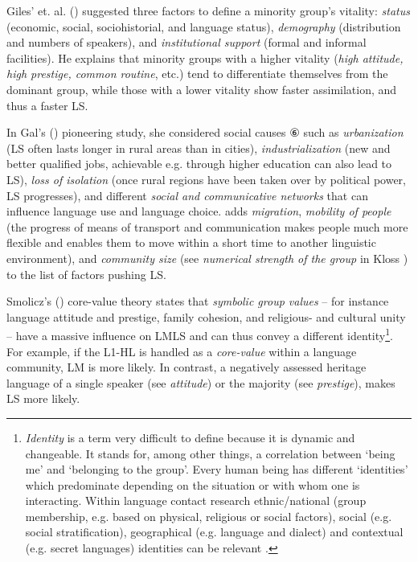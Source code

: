 \documentclass[output=paper,
modfonts
]{langscibook}
\begin{document}
Giles' et. al. (\citeyear{Giles1977}) suggested three factors to define a minority group's vitality: \emph{status} (economic, social, sociohistorial, and language status), \emph{demography} (distribution and numbers of speakers), and \emph{institutional support} (formal and informal facilities). He explains that minority groups with a higher vitality (\emph{high attitude, high prestige, common routine}, etc.) tend to differentiate themselves from the dominant group, while those with a lower vitality show faster assimilation, and thus a faster LS.

In Gal's (\citeyear{Gal1979}) pioneering study, she considered social causes ⑥ such as \emph{urbanization} (LS often lasts longer in rural areas than in cities), \emph{industrialization} (new and better qualified jobs, achievable e.g. through higher education can also lead to LS), \emph{loss of isolation} (once rural regions have been taken over by political power, LS progresses), and different \emph{social and communicative networks} that can influence language use and language choice. \cite{Dorian1980} adds \emph{migration}, \emph{mobility of people} (the progress of means of transport and communication makes people much more flexible and enables them to move within a short time to another linguistic environment), and \emph{community size} (see \emph{numerical strength of the group} in Kloss \citeyear{Kloss1966}) to the list of factors pushing LS.

Smolicz's (\citeyear{Smolicz1980}) core-value theory states that \emph{symbolic group values} -- for instance language attitude and prestige, family cohesion, and religious- and cultural unity -- have a massive influence on LMLS and can thus convey a different identity\footnote{\emph{Identity} is a term very difficult to define because it is dynamic and changeable. It stands for, among other things, a correlation between ‘being me' and ‘belonging to the group'. Every human being has different ‘identities' which predominate depending on the situation or with whom one is interacting. Within language contact research ethnic/national (group membership, e.g. based on physical, religious or social factors), social (e.g. social stratification), geographical (e.g. language and dialect) and contextual (e.g. secret languages) identities can be relevant \parencite[172-173]{Riehl2014}.}. For example, if the L1-HL is handled as a \emph{core-value} within a language community, LM is more likely. In contrast, a negatively assessed heritage language of a single speaker (see \emph{attitude}) or the majority (see \emph{prestige}), makes LS more likely.
\end{document}
